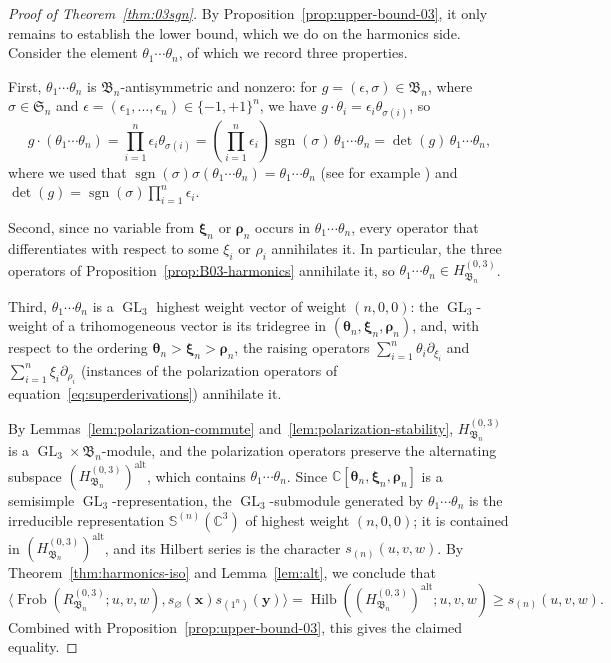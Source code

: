 \documentclass[12pt]{amsart}
\theoremstyle{plain}
\theoremstyle{definition}
\DeclareMathOperator{\Frob}{Frob}
\DeclareMathOperator{\Hilb}{Hilb}
\DeclareMathOperator{\alt}{alt}
\DeclareMathOperator{\GL}{GL}
\DeclareMathOperator{\sgn}{sgn}
\newcommand{\C}{\mathbb{C}}
\newcommand{\x}{\mathbf{x}}
\newcommand{\y}{\mathbf{y}}
\begin{document}
\begin{proof}[Proof of Theorem~\ref{thm:03sgn}]
    By Proposition~\ref{prop:upper-bound-03}, it only remains to establish the lower bound, which we do on the harmonics side.
    Consider the element $\theta_1\cdots \theta_n$, of which we record three properties.

    First, $\theta_1\cdots \theta_n$ is $\mathfrak{B}_n$-antisymmetric and nonzero: for $g = (\epsilon, \sigma) \in \mathfrak{B}_n$, where $\sigma \in \mathfrak{S}_n$ and $\epsilon = (\epsilon_1,\ldots,\epsilon_n) \in \{-1,+1\}^n$, we have $g \cdot \theta_i = \epsilon_i \theta_{\sigma (i)}$, so
    \begin{equation}
        g \cdot (\theta_1\cdots \theta_n) = \prod_{i=1}^n \epsilon_i \theta_{\sigma (i)} = \left(\prod_{i=1}^n \epsilon_i\right) \sgn(\sigma)\, \theta_1\cdots \theta_n = \det(g)\, \theta_1\cdots \theta_n,
    \end{equation}
    where we used that $\sgn(\sigma)\sigma(\theta_1\cdots \theta_{n}) = \theta_1\cdots \theta_{n}$ (see for example \cite[Chapter III, Section 7.3, Proposition 5]{BourbakiAlgebraI}) and $\det(g) = \sgn(\sigma)\prod_{i=1}^n \epsilon_i$.

    Second, since no variable from $\bm{\xi}_n$ or $\bm{\rho}_n$ occurs in $\theta_1\cdots \theta_n$, every operator that differentiates with respect to some $\xi_i$ or $\rho_i$ annihilates it.
    In particular, the three operators of Proposition~\ref{prop:B03-harmonics} annihilate it, so $\theta_1\cdots \theta_n \in H_{\mathfrak{B}_n}^{(0,3)}$.

    Third, $\theta_1\cdots \theta_n$ is a $\GL_3$ highest weight vector of weight $(n,0,0)$: the $\GL_3$-weight of a trihomogeneous vector is its tridegree in $(\bm{\theta}_n,\bm{\xi}_n,\bm{\rho}_n)$, and, with respect to the ordering $\bm{\theta}_n > \bm{\xi}_n > \bm{\rho}_n$, the raising operators $\sum_{i=1}^n \theta_i \partial_{\xi_i}$ and $\sum_{i=1}^n \xi_i \partial_{\rho_i}$ (instances of the polarization operators of equation~\eqref{eq:superderivations}) annihilate it.

By Lemmas~\ref{lem:polarization-commute} and~\ref{lem:polarization-stability}, $H_{\mathfrak{B}_n}^{(0,3)}$ is a $\GL_3 \times \mathfrak{B}_n$-module, and the polarization operators preserve the alternating subspace $(H_{\mathfrak{B}_n}^{(0,3)})^{\alt}$, which contains $\theta_1\cdots\theta_n$.
Since $\C[\bm{\theta}_n,\bm{\xi}_n,\bm{\rho}_n]$ is a semisimple $\GL_3$-representation, the $\GL_3$-submodule generated by $\theta_1\cdots\theta_n$ is the irreducible representation $\mathbb{S}^{(n)}(\C^3)$ of highest weight $(n,0,0)$; it is contained in $(H_{\mathfrak{B}_n}^{(0,3)})^{\alt}$, and its Hilbert series is the character $s_{(n)}(u,v,w)$.
By Theorem~\ref{thm:harmonics-iso} and Lemma~\ref{lem:alt}, we conclude that
    \begin{equation}
        \langle \Frob(R_{\mathfrak{B}_n}^{(0,3)}; u,v,w), s_{\varnothing}(\x) s_{(1^n)}(\y)\rangle = \Hilb((H_{\mathfrak{B}_n}^{(0,3)})^{\alt};u,v,w) \geq s_{(n)}(u,v,w).
    \end{equation}
    Combined with Proposition~\ref{prop:upper-bound-03}, this gives the claimed equality.
\end{proof}
\end{document}
